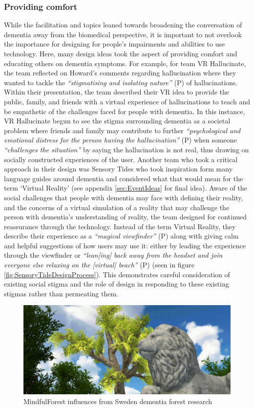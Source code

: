 \subsubsection{Providing comfort}
\label{ThemeThree:SubThemeOne}
While the facilitation and topics leaned towards broadening the conversation of dementia away from the biomedical perspective, it is important to not overlook the importance for designing for people’s impairments and abilities to use technology. Here, many design ideas took the aspect of providing comfort and educating others on dementia symptoms. For example, for team VR Hallucinate, the team reflected on Howard’s comments regarding hallucination where they wanted to tackle the \textit{``stigmatising and isolating nature''} (P) of hallucinations. Within their presentation, the team described their VR idea to provide the public, family, and friends with a virtual experience of hallucinations to teach and be empathetic of the challenges faced for people with dementia. In this instance, VR Hallucinate begun to see the stigma surrounding dementia as a societal problem where friends and family may contribute to further \textit{``psychological and emotional distress for the person having the hallucination''} (P) when someone \textit{``challenges the situation''} by saying the hallucination is not real, thus drawing on socially constructed experiences of the user. Another team who took a critical approach in their design was Sensory Tides who took inspiration form many language guides around dementia and considered what that would mean for the term `Virtual Reality' (see appendix \ref{sec:EventIdeas} for final idea). Aware of the social challenges that people with dementia may face with defining their reality, and the concerns of a virtual simulation of a reality that may challenge the person with dementia’s understanding of reality, the team designed for continued reassurance through the technology. Instead of the term Virtual Reality, they describe their experience as a \textit{``magical viewfinder''} (P) along with giving calm and helpful suggestions of how users may use it: either by leading the experience through the viewfinder or \textit{``lean[ing] back away from the headset and join everyone else relaxing on the [virtual] beach''} (P) (seen in figure \ref{fig:SensoryTideDesignProcess}). This demonstrates careful consideration of existing social stigma and the role of design in responding to these existing stigmas rather than permeating them. 


\begin{figure}[htp]
\centering
\includegraphics[width=.8\linewidth]{Images/DemVR/Findings/MindfulForest.png}
\caption{MindfulForest influences from Sweden dementia forest research}
\label{fig:MindFulForestResearch}
\end{figure}


